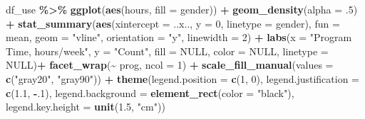 \documentclass[
]{article}
\newenvironment{Shaded}{\begin{snugshade}}{\end{snugshade}}
\newcommand{\AttributeTok}[1]{\textcolor[rgb]{0.13,0.29,0.53}{#1}}
\newcommand{\ConstantTok}[1]{\textcolor[rgb]{0.56,0.35,0.01}{#1}}
\newcommand{\DecValTok}[1]{\textcolor[rgb]{0.00,0.00,0.81}{#1}}
\newcommand{\FloatTok}[1]{\textcolor[rgb]{0.00,0.00,0.81}{#1}}
\newcommand{\FunctionTok}[1]{\textcolor[rgb]{0.13,0.29,0.53}{\textbf{#1}}}
\newcommand{\NormalTok}[1]{#1}
\newcommand{\SpecialCharTok}[1]{\textcolor[rgb]{0.81,0.36,0.00}{\textbf{#1}}}
\newcommand{\StringTok}[1]{\textcolor[rgb]{0.31,0.60,0.02}{#1}}
\begin{document}
\clearpage

\begin{Shaded}
\begin{Highlighting}[]
\NormalTok{df\_use }\SpecialCharTok{\%\textgreater{}\%} 
  \FunctionTok{ggplot}\NormalTok{(}\FunctionTok{aes}\NormalTok{(hours,}
             \AttributeTok{fill =}\NormalTok{ gender)) }\SpecialCharTok{+} 
  \FunctionTok{geom\_density}\NormalTok{(}\AttributeTok{alpha =}\NormalTok{ .}\DecValTok{5}\NormalTok{) }\SpecialCharTok{+}  
  \FunctionTok{stat\_summary}\NormalTok{(}\FunctionTok{aes}\NormalTok{(}\AttributeTok{xintercept =}\NormalTok{ ..x.., }
                   \AttributeTok{y =} \DecValTok{0}\NormalTok{,}
                   \AttributeTok{linetype =}\NormalTok{ gender), }
               \AttributeTok{fun =}\NormalTok{ mean, }
               \AttributeTok{geom =} \StringTok{"vline"}\NormalTok{, }
               \AttributeTok{orientation =} \StringTok{"y"}\NormalTok{,}
               \AttributeTok{linewidth =} \DecValTok{2}\NormalTok{) }\SpecialCharTok{+}
  \FunctionTok{labs}\NormalTok{(}\AttributeTok{x =} \StringTok{"Program Time, hours/week"}\NormalTok{,}
       \AttributeTok{y =} \StringTok{"Count"}\NormalTok{,}
       \AttributeTok{fill =} \ConstantTok{NULL}\NormalTok{,}
       \AttributeTok{color =} \ConstantTok{NULL}\NormalTok{,}
       \AttributeTok{linetype =} \ConstantTok{NULL}\NormalTok{)}\SpecialCharTok{+}
  \FunctionTok{facet\_wrap}\NormalTok{(}\SpecialCharTok{\textasciitilde{}}\NormalTok{ prog, }\AttributeTok{ncol =} \DecValTok{1}\NormalTok{) }\SpecialCharTok{+}
  \FunctionTok{scale\_fill\_manual}\NormalTok{(}\AttributeTok{values =} \FunctionTok{c}\NormalTok{(}\StringTok{"gray20"}\NormalTok{, }\StringTok{"gray90"}\NormalTok{)) }\SpecialCharTok{+}
  \FunctionTok{theme}\NormalTok{(}\AttributeTok{legend.position =} \FunctionTok{c}\NormalTok{(}\DecValTok{1}\NormalTok{, }\DecValTok{0}\NormalTok{),}
        \AttributeTok{legend.justification =} \FunctionTok{c}\NormalTok{(}\FloatTok{1.1}\NormalTok{, }\SpecialCharTok{{-}}\NormalTok{.}\DecValTok{1}\NormalTok{),}
        \AttributeTok{legend.background =} \FunctionTok{element\_rect}\NormalTok{(}\AttributeTok{color =} \StringTok{"black"}\NormalTok{),}
        \AttributeTok{legend.key.height =} \FunctionTok{unit}\NormalTok{(}\FloatTok{1.5}\NormalTok{, }\StringTok{"cm"}\NormalTok{))}
\end{Highlighting}
\end{Shaded}
\end{document}
